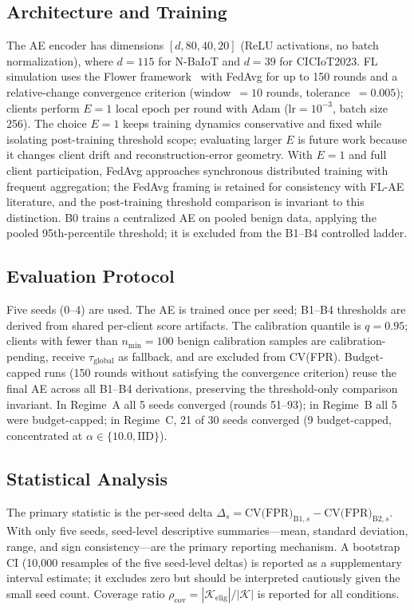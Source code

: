 \subsection{Architecture and Training}
The AE encoder has dimensions $[d, 80, 40, 20]$ (ReLU activations, no batch normalization),
where $d=115$ for N-BaIoT and $d=39$ for CICIoT2023.
FL simulation uses the Flower framework~\cite{beutel2020flower} with FedAvg
for up to 150 rounds and a relative-change convergence criterion
(window~$= 10$ rounds, tolerance~$= 0.005$); clients perform $E{=}1$ local epoch
per round with Adam ($\text{lr}=10^{-3}$, batch size 256).
The choice $E{=}1$ keeps training dynamics conservative and fixed while isolating
post-training threshold scope; evaluating larger $E$ is future work because it changes
client drift and reconstruction-error geometry.
With $E{=}1$ and full client participation, FedAvg approaches synchronous distributed
training with frequent aggregation; the FedAvg framing is retained for consistency with
FL-AE literature, and the post-training threshold comparison is invariant to this distinction.
B0 trains a centralized AE on pooled benign data, applying the pooled 95th-percentile
threshold; it is excluded from the B1--B4 controlled ladder.

\subsection{Evaluation Protocol}
Five seeds (0--4) are used. The AE is trained once per seed; B1--B4 thresholds
are derived from shared per-client score artifacts.
The calibration quantile is $q=0.95$;
clients with fewer than $n_{\min}=100$ benign calibration samples are calibration-pending,
receive $\tau_{\text{global}}$ as fallback, and are excluded from CV(FPR).
Budget-capped runs (150 rounds without satisfying the convergence criterion) reuse
the final AE across all B1--B4 derivations, preserving the threshold-only
comparison invariant.
In Regime~A all 5 seeds converged (rounds 51--93);
in Regime~B all 5 were budget-capped;
in Regime~C, 21 of 30 seeds converged (9 budget-capped, concentrated at $\alpha\in\{10.0,\mathrm{IID}\}$).

\subsection{Statistical Analysis}
The primary statistic is the per-seed delta $\Delta_s = \text{CV(FPR)}_{\text{B1},s} - \text{CV(FPR)}_{\text{B2},s}$.
With only five seeds, seed-level descriptive summaries---mean, standard deviation,
range, and sign consistency---are the primary reporting mechanism.
A bootstrap CI (10{,}000 resamples of the five seed-level deltas) is reported as a
supplementary interval estimate; it excludes zero but should be interpreted cautiously
given the small seed count.
Coverage ratio $\rho_{\text{cov}} = |\mathcal{K}_{\mathrm{elig}}| / |\mathcal{K}|$ is reported for all conditions.

